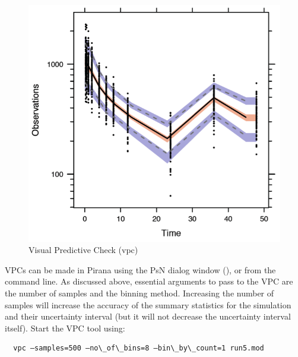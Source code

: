 \begin{figure}[H] \centering
    \includegraphics[scale=0.8]{images/fig5_vpc.png}
    \caption{Visual Predictive Check (vpc)}
\end{figure}

VPCs can be made in Pirana using the PsN dialog window (),
or from the command line. As discussed above, essential arguments to
pass to the VPC are the number of samples and the binning
method. Increasing the number of samples will increase the accuracy of
the summary statistics for the simulation and their uncertainty
interval (but it will not decrease the uncertainty interval
itself). Start the VPC tool using:

\begin{lstlisting}
  vpc –samples=500 –no\_of\_bins=8 –bin\_by\_count=1 run5.mod
\end{lstlisting}

